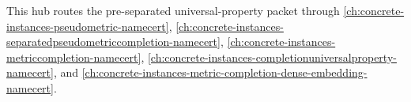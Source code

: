 This hub routes the pre-separated universal-property packet through \autoref{ch:concrete-instances-pseudometric-namecert}, \autoref{ch:concrete-instances-separatedpseudometriccompletion-namecert}, \autoref{ch:concrete-instances-metriccompletion-namecert}, \autoref{ch:concrete-instances-completionuniversalproperty-namecert}, and \autoref{ch:concrete-instances-metric-completion-dense-embedding-namecert}.


